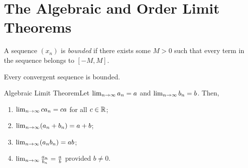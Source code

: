 \section{The Algebraic and Order Limit Theorems}

\begin{definition}
    A sequence \((x_n)\) is \textit{bounded} if there exists some \(M > 0\) such that every term in the sequence belongs to \([-M,M]\).
\end{definition}

\begin{theorem}
    Every convergent sequence is bounded.
\end{theorem}


\begin{ntheorem}
    {Algebraic Limit Theorem}Let \(\lim_{n \rightarrow \infty}a_n = a\) and \(\lim_{n \rightarrow \infty}b_n = b\). Then,
    \begin{enumerate}[label=(\roman*)]
        \item \(\lim_{n \rightarrow \infty}ca_n = ca\) for all \(c \in \mathbb{R}\);
        \item \(\lim_{n \rightarrow \infty}(a_n + b_n) = a + b\);
        \item \(\lim_{n \rightarrow \infty}(a_nb_n) = ab\);
        \item \(\lim_{n \rightarrow \infty}\frac{a_n}{b_n} = \frac{a}{b}\) provided \(b \neq 0\).
    \end{enumerate}
\end{ntheorem}

